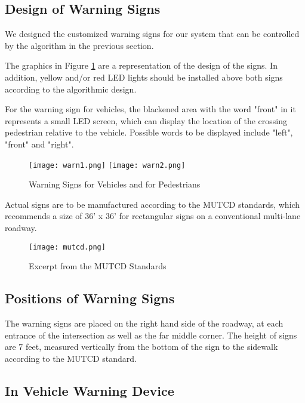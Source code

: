\documentclass{article}
\begin{document}
\subsection{Design of Warning Signs}
We designed the customized warning signs for our system that can be controlled by the algorithm in the previous section. 

The graphics in Figure \ref{fig:warning_signs} are a representation of the design of the signs. In addition, yellow and/or red LED lights should be installed above both signs according to the algorithmic design. 

For the warning sign for vehicles, the blackened area with the word "front" in it represents a small LED screen, which can display the location of the crossing pedestrian relative to the vehicle. Possible words to be displayed include "left", "front" and "right".

\begin{figure}
    \centering
    \texttt{[image: warn1.png]}
    \texttt{[image: warn2.png]}
    \caption{Warning Signs for Vehicles and for Pedestrians}
    \label{fig:warning_signs}
\end{figure}

Actual signs are to be manufactured according to the MUTCD  standards, which recommends a size of 36' x 36' for rectangular signs on a conventional multi-lane roadway.

\begin{figure}
    \centering
    \texttt{[image: mutcd.png]}
    \caption{Excerpt from the MUTCD Standards}
    \label{fig:mutcd}
\end{figure}

\subsection{Positions of Warning Signs}

The warning signs are placed on the right hand side of the roadway, at each entrance of the intersection as well as the far middle corner. The height of signs are 7 feet, measured vertically from the bottom of the sign to the sidewalk according to the MUTCD standard. 

\subsection{In Vehicle Warning Device}
\end{document}
